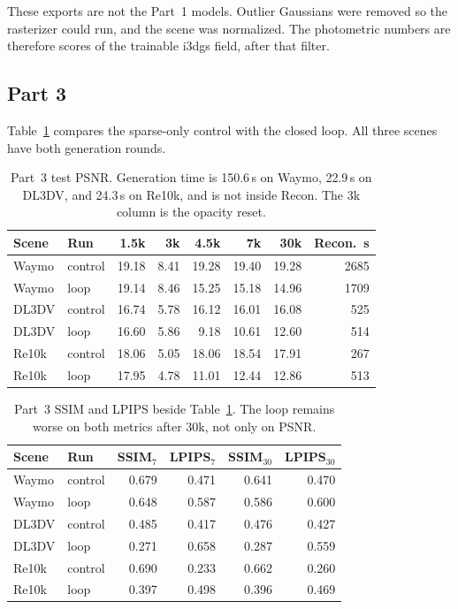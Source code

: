 \documentclass[10pt,twocolumn,letterpaper]{article}
\begin{document}
These exports are not the Part~1 models.
Outlier Gaussians were removed so the rasterizer could run, and the scene was normalized.
The photometric numbers are therefore scores of the trainable i3dgs field, after that filter.

\subsection{Part 3}
Table~\ref{tab:part3} compares the sparse-only control with the closed loop.
All three scenes have both generation rounds.

\begin{table}[t]
\centering
\small
\setlength{\tabcolsep}{3.2pt}
\begin{tabular}{llrrrrrr}
\toprule
Scene & Run & 1.5k & 3k & 4.5k & 7k & 30k & Recon.~s \\
\midrule
Waymo & control & 19.18 & 8.41 & 19.28 & 19.40 & 19.28 & 2685 \\
Waymo & loop & 19.14 & 8.46 & 15.25 & 15.18 & 14.96 & 1709 \\
DL3DV & control & 16.74 & 5.78 & 16.12 & 16.01 & 16.08 & 525 \\
DL3DV & loop & 16.60 & 5.86 & 9.18 & 10.61 & 12.60 & 514 \\
Re10k & control & 18.06 & 5.05 & 18.06 & 18.54 & 17.91 & 267 \\
Re10k & loop & 17.95 & 4.78 & 11.01 & 12.44 & 12.86 & 513 \\
\bottomrule
\end{tabular}
\caption{Part~3 test PSNR. Generation time is 150.6\,s on Waymo, 22.9\,s on DL3DV, and 24.3\,s on Re10k, and is not inside Recon. The 3k column is the opacity reset.}
\label{tab:part3}
\end{table}

\begin{table}[t]
\centering
\small
\setlength{\tabcolsep}{4pt}
\begin{tabular}{llrrrr}
\toprule
Scene & Run & SSIM$_{7}$ & LPIPS$_{7}$ & SSIM$_{30}$ & LPIPS$_{30}$ \\
\midrule
Waymo & control & 0.679 & 0.471 & 0.641 & 0.470 \\
Waymo & loop & 0.648 & 0.587 & 0.586 & 0.600 \\
DL3DV & control & 0.485 & 0.417 & 0.476 & 0.427 \\
DL3DV & loop & 0.271 & 0.658 & 0.287 & 0.559 \\
Re10k & control & 0.690 & 0.233 & 0.662 & 0.260 \\
Re10k & loop & 0.397 & 0.498 & 0.396 & 0.469 \\
\bottomrule
\end{tabular}
\caption{Part~3 SSIM and LPIPS beside Table~\ref{tab:part3}. The loop remains worse on both metrics after 30k, not only on PSNR.}
\label{tab:part3b}
\end{table}
\end{document}
